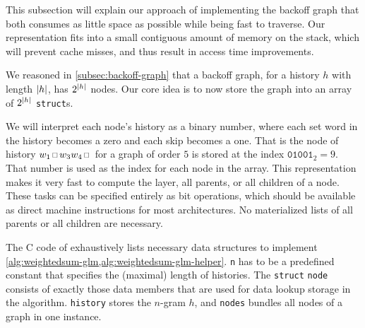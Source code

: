 This subsection will explain our approach of implementing the backoff graph that
both consumes as little space as possible while being fast to traverse.
Our representation fits into a small contiguous amount of memory on the stack,
which will prevent cache misses, and thus result in access time improvements.

We reasoned in \cref{subsec:backoff-graph} that a backoff graph, for a history
$h$ with length ${\left|h\right|}$, has $2^{\left|h\right|}$ nodes.
Our core idea is to now store the graph into an array of $2^{\left|h\right|}$
\texttt{struct}s.

We will interpret each node's history as a binary number, where each set word
in the history becomes a zero and each skip becomes a one.
That is the node of history $w_1 \Skp w_3 w_4 \Skp$ for a graph of order $5$
is stored at the index $\texttt{01001}_2 = 9$.
That number is used as the index for each node in the array.
This representation makes it very fast to compute the layer, all parents, or
all children of a node.
These tasks can be specified entirely as bit operations, which should be
available as direct machine instructions for most architectures.
No materialized lists of all parents or all children are necessary.

The C code of  exhaustively lists necessary data
structures to implement \cref{alg:weightedsum-glm,alg:weightedsum-glm-helper}.
\texttt{n} has to be a predefined constant that specifies the (maximal) length
of histories.
The \texttt{struct} \texttt{node} consists of exactly those data members that are
used for data lookup storage in the algorithm.
\texttt{history} stores the $n$-gram $h$, and \texttt{nodes} bundles all nodes
of a graph in one instance.

